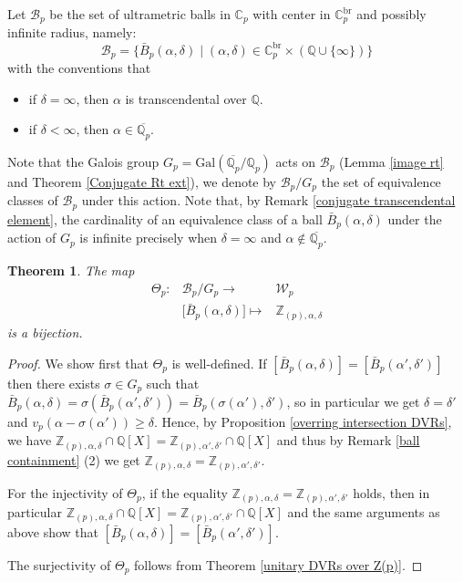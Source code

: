 \documentclass[10pt]{article}
\numberwithin{equation}{section}
\newtheorem{Thm}[equation]{Theorem}
\theoremstyle{definition}
\theoremstyle{definition}
\newcommand{\Q}{\mathbb{Q}}
\newcommand{\Z}{\mathbb{Z}}
\newcommand{\C}{\mathbb{C}}
\newcommand{\oQp}{\overline{\Q_p}}
\newcommand{\Gal}{\text{Gal}}
\newcommand{\br}{\text{br}}
\newcommand\bc { \color{blue}}
\begin{document}
 

 Let $\mathcal{B}_p$ be the set of ultrametric balls in $\C_p$  with center in $\C_p^{\br}$ and possibly infinite radius, namely:
 $$\mathcal{B}_p=\{\bar B_p(\alpha,\delta)\mid (\alpha,\delta)\in\C_p^{\br}\times(\Q\cup\{\infty\})\}$$
with the conventions that 
\begin{itemize}
    \item[-] if $\delta=\infty$, then $\alpha$ is transcendental over $\Q$.
    \item[-] if $\delta<\infty$, then $\alpha\in\oQp$.
\end{itemize}
Note that the Galois group $G_p=\Gal(\oQp/\Q_p)$ acts on $\mathcal{B}_p$ (Lemma \ref{image rt} and Theorem \ref{Conjugate Rt ext}), we denote by $\mathcal{B}_p/G_p$ the set of equivalence classes of $\mathcal{B}_p$ under this action.  Note that, by Remark \ref{conjugate transcendental element}, the cardinality of an equivalence class of a ball $\bar B_p(\alpha,\delta)$ under the action of $G_p$ is infinite precisely when $\delta=\infty$ and $\alpha\not\in\oQp$.  
\begin{Thm}\label{ultrametric balls modulo Galois are DVRs} 
The map
$$\begin{array}{lcc}
   \Theta_p:&\mathcal{B}_p/G_p\to & \mathcal{W}_p\\
   &{[} \bar{B}_p(\alpha,\delta){]}\mapsto &\Z_{(p),\alpha,\delta}
\end{array}$$
is a bijection.
\end{Thm}
\begin{proof}
   We show first that $\Theta_p$ is well-defined. If $[\bar{B}_p(\alpha,\delta)]=[\bar{B}_p(\alpha',\delta')]$ then there exists $\sigma\in G_p$ such that $\bar{B}_p(\alpha,\delta)=\sigma(\bar{B}_p(\alpha',\delta'))=\bar{B}_p(\sigma(\alpha'),\delta')$, so in particular we get $\delta=\delta'$ and $v_p(\alpha-\sigma(\alpha'))\geq\delta$. Hence, by Proposition \ref{overring intersection DVRs}, we have $\Z_{(p),\alpha,\delta}\cap\Q[X]=\Z_{(p),\alpha',\delta'}\cap\Q[X]$ and thus by Remark \ref{ball containment} (2) we get $\Z_{(p),\alpha,\delta}=\Z_{(p),\alpha',\delta'}$.   

  For the injectivity of $\Theta_p$, if the equality $\Z_{(p),\alpha,\delta}=\Z_{(p),\alpha',\delta'}$ holds, then in particular $\Z_{(p),\alpha,\delta}\cap\Q[X]=\Z_{(p),\alpha',\delta'}\cap\Q[X]$ and the same arguments as above show that $[\bar{B}_p(\alpha,\delta)]=[\bar{B}_p(\alpha',\delta')]$.

   The surjectivity of $\Theta_p$ follows from Theorem \ref{unitary DVRs over Z(p)}.
\end{proof}
\end{document}
